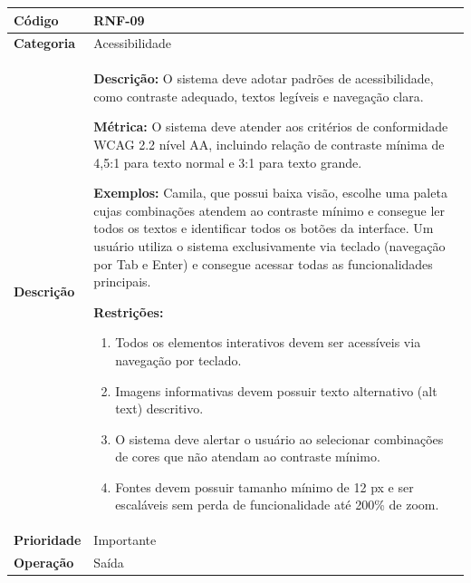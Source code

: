 \FloatBarrier
\begin{quadro}[h!]
\caption{RNF-09 -- Acessibilidade}
\label{quad:rnf09}
\begin{tabular}{|p{3.2cm}|p{11.8cm}|}
\hline
\textbf{Código}     & RNF-09 \\ \hline
\textbf{Categoria}  & Acessibilidade \\ \hline
\textbf{Descrição}  &
\textbf{Descrição:} O sistema deve adotar padrões de acessibilidade, como contraste adequado, textos legíveis e navegação clara.

\textbf{Métrica:} O sistema deve atender aos critérios de conformidade WCAG 2.2 nível AA, incluindo relação de contraste mínima de 4,5:1 para texto normal e 3:1 para texto grande.

\textbf{Exemplos:} Camila, que possui baixa visão, escolhe uma paleta cujas combinações atendem ao contraste mínimo e consegue ler todos os textos e identificar todos os botões da interface.
Um usuário utiliza o sistema exclusivamente via teclado (navegação por Tab e Enter) e consegue acessar todas as funcionalidades principais.

\textbf{Restrições:}
\begin{enumerate}[nosep,leftmargin=1.2em,topsep=2pt,partopsep=0pt,parsep=0pt,itemsep=1pt]
  \item Todos os elementos interativos devem ser acessíveis via navegação por teclado.
  \item Imagens informativas devem possuir texto alternativo (alt text) descritivo.
  \item O sistema deve alertar o usuário ao selecionar combinações de cores que não atendam ao contraste mínimo.
  \item Fontes devem possuir tamanho mínimo de 12 px e ser escaláveis sem perda de funcionalidade até 200\% de zoom.
\end{enumerate} \\ \hline
\textbf{Prioridade} & Importante \\ \hline
\textbf{Operação}   & Saída \\ \hline
\end{tabular}
\end{quadro}

